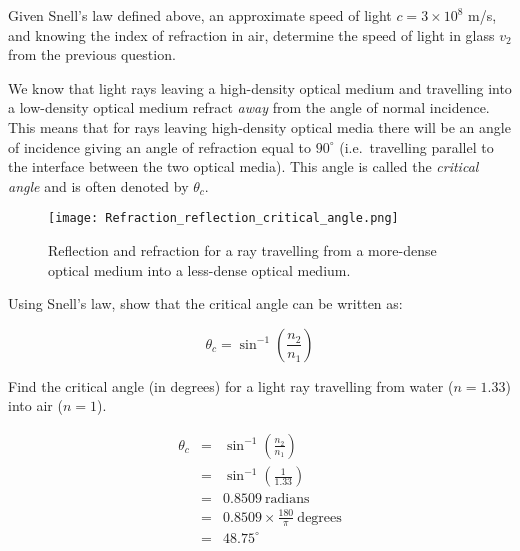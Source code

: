 \documentclass[a4paper, DIV=17]{scrartcl}
\begin{document}
\begin{question}
    Given Snell's law defined above, an approximate speed of light $c =
    3\times10^8$ m/s, and knowing the index of refraction in air, determine
    the speed of light in glass $v_2$ from the previous question.
\end{question}

\begin{question}
    We know that light rays leaving a high-density optical medium and
    travelling into a low-density optical medium refract \emph{away} from
    the angle of normal incidence.  This means that for rays leaving
    high-density optical media there will be an angle of incidence giving an
    angle of refraction equal to $90^\circ$ (i.e.~travelling parallel to the
    interface between the two optical media).  This angle is called the
    \emph{critical angle} and is often denoted by $\theta_c$.

\begin{figure}[h]
    \centerline{\texttt{[image: Refraction\_reflection\_critical\_angle.png]}}
    \caption{Reflection and refraction for a ray travelling from a
    more-dense optical medium into a less-dense optical medium.}
\end{figure}

    Using Snell's law, show that the critical angle can be written as:

    \begin{equation}
	\theta_c = \sin^{-1}\left(\frac{n_2}{n_1}\right)
    \end{equation}

\end{question}

\begin{question}
    Find the critical angle (in degrees) for a light ray travelling from
    water ($n = 1.33$) into air ($n = 1$).
\end{question}

\begin{solution}
    \begin{eqnarray}
	\theta_c &=& \sin^{-1}\left(\frac{n_2}{n_1}\right)\\
	&=& \sin^{-1}\left(\frac{1}{1.33}\right)\\
	&=& 0.8509\ \mathrm{radians}\\
	&=& 0.8509 \times \frac{180}{\pi}\ \mathrm{degrees}\\
	&=& 48.75^\circ
    \end{eqnarray}
\end{solution}

\end{document}

